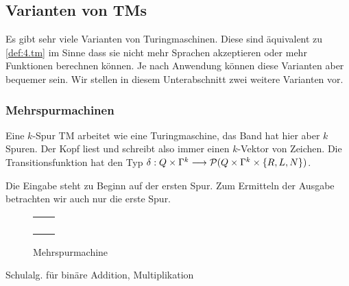 \subsection{Varianten von \ac{TM}s}
Es gibt sehr viele Varianten von Turingmaschinen.
Diese sind äquivalent zu \autoref{def:4.tm} im Sinne dass sie nicht mehr Sprachen akzeptieren oder mehr Funktionen berechnen können.
Je nach Anwendung können diese Varianten aber bequemer sein. Wir stellen in diesem Unterabschnitt zwei weitere Varianten vor.


\subsubsection{Mehrspurmachinen}

Eine $k$-Spur \ac{TM} arbeitet wie eine Turingmaschine, das Band hat hier aber $k$ Spuren.
Der Kopf liest und schreibt also immer einen $k$-Vektor von Zeichen.
Die Transitionsfunktion hat den Typ $\delta: Q\times\Gamma^k\--> \Powerset(Q\times\Gamma^k\times\{R,L,N\})$.

Die Eingabe steht zu Beginn auf der ersten Spur.
Zum Ermitteln der Ausgabe betrachten wir auch nur die erste Spur.

	\begin{figure}[H]\centering
		{\renewcommand{\arraystretch}{0.8}
		\begin{tabu} to .5\textwidth {X[.35]|X[.65]}
			&\\\hline
			&\\\hline
			&\\\hline
			&\\\hline
			&
		\end{tabu}}
		\caption{Mehrspurmachine}
	\end{figure}

	\begin{Bsp*}
		Schulalg. für binäre Addition, Multiplikation
	\end{Bsp*}

